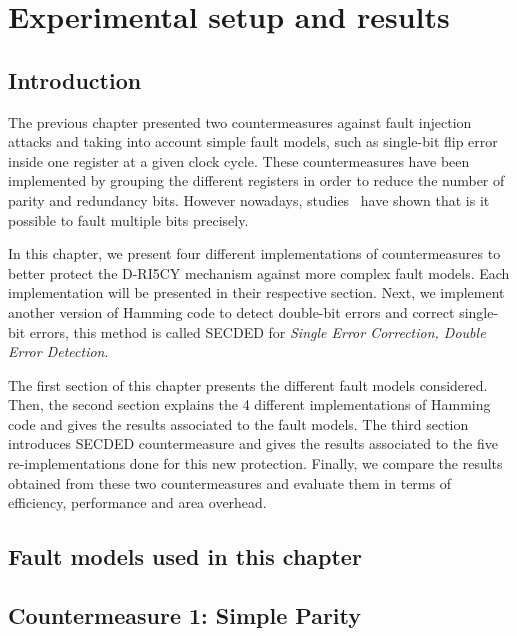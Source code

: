 \chapter{Experimental setup and results}
\label{chapter:exp_setup_results}
\minitoc

\section{Introduction}
The previous chapter presented two countermeasures against fault injection attacks and taking into account simple fault models, such as single-bit flip error inside one register at a given clock cycle. These countermeasures have been implemented by grouping the different registers in order to reduce the number of parity and redundancy bits. However nowadays, studies~\cite{CGVCBLC-22-cardis,VDSPB-24-jce} have shown that is it possible to fault multiple bits precisely.

In this chapter, we present four different implementations of countermeasures to better protect the D-RI5CY mechanism against more complex fault models. Each implementation will be presented in their respective section. Next, we implement another version of Hamming code to detect double-bit errors and correct single-bit errors, this method is called SECDED for \textit{Single Error Correction, Double Error Detection}.

The first section of this chapter presents the different fault models considered. Then, the second section explains the 4 different implementations of Hamming code and gives the results associated to the fault models. The third section introduces SECDED countermeasure and gives the results associated to the five re-implementations done for this new protection. Finally,  we compare the results obtained from these two countermeasures and evaluate them in terms of efficiency, performance and area overhead.

\section{Fault models used in this chapter}


\section{Countermeasure 1: Simple Parity}

